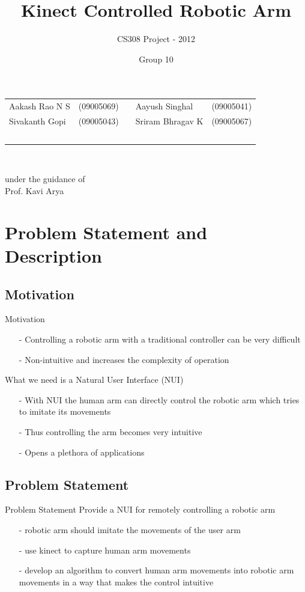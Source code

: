 \documentclass{beamer}
\title[Kinect Controlled Robotic Arm]{Kinect Controlled Robotic Arm}
\author {CS308 Project - 2012}
\date{Group 10}
\begin{document}
\begin{frame}
\titlepage


\begin{tabular}{lllll}
Aakash Rao N S & (09005069) & & Aayush Singhal &  (09005041) \\
Sivakanth Gopi  &  (09005043) & & Sriram Bhragav K &  (09005067)\\\
\end{tabular}\\

\begin{center}
under the guidance of\\
Prof. Kavi Arya
\end{center}
\end{frame}

\section{Problem Statement and Description}
\subsection{Motivation}
\begin{frame}{Motivation}
\begin{itemize}
\item[-] Controlling a robotic arm with a traditional controller can be very difficult
\item[-] Non-intuitive and increases the complexity of operation
\end{itemize}
What we need is a Natural User Interface (NUI)
\begin{itemize}
\item[-] With NUI the human arm can directly control the robotic arm which tries to imitate its movements
\item[-] Thus controlling the arm becomes very intuitive 
\item[-] Opens a plethora of applications
\end{itemize}
\end{frame}


\subsection{Problem Statement}
\begin{frame}{Problem Statement}
Provide a NUI for remotely controlling  a robotic arm
\begin{itemize}
\item[-] robotic arm should imitate the movements of the user arm
\item[-] use kinect to capture human arm movements
\item[-] develop an algorithm to convert human arm movements into robotic arm movements in a way that makes the control intuitive
\end{itemize}
\end{frame}
\end{document}
